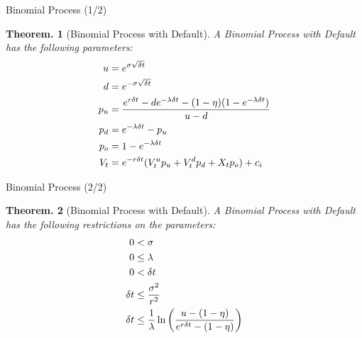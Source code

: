 \documentclass{beamer}
\newtheorem{thm}{Theorem.}
\begin{document}
\begin{frame}{Binomial Process (1/2)}
\begin{thm}[Binomial Process with Default]
A Binomial Process with Default has the following parameters:
\begin{align*}
  u  &= e^{\sigma\sqrt{\delta t}} \\
  d  &= e^{-\sigma\sqrt{\delta t}} \\
  p_u &= \frac{e^{r\delta t} - d e^{-\lambda\delta t} - (1 - \eta)(1 - e^{-\lambda\delta t})}{u - d} \\
  p_d &= e^{-\lambda\delta t} - p_u \\
  p_o &= 1 - e^{-\lambda\delta t} \\
  V_t  &= e^{-r\delta t}(V^{u}_tp_u + V^{d}_tp_d + X_tp_o) + c_i \\
\end{align*}
\end{thm}
\end{frame}

\begin{frame}{Binomial Process (2/2)}
\begin{thm}[Binomial Process with Default]
A Binomial Process with Default has the following restrictions on the parameters:
\begin{align*}
  0   &< \sigma \\
  0   &\le \lambda \\
  0   &< \delta t \\
  \delta t &\le \frac{\sigma^2}{r^2} \\
  \delta t &\le \frac{1}{\lambda}\ln\left(\frac{u - (1 - \eta)}{e^{r\delta t} - (1 - \eta)}\right) \\
\end{align*}
\end{thm}
\end{frame}
\end{document}
